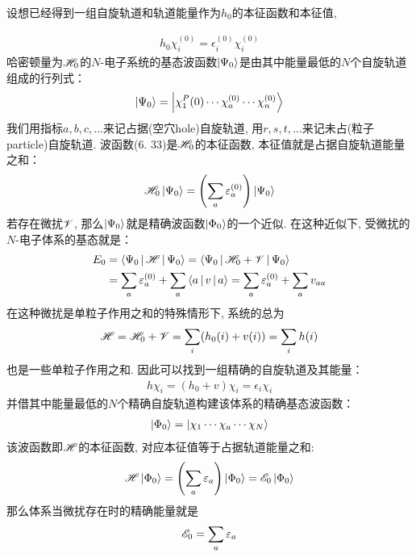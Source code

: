 设想已经得到一组自旋轨道和轨道能量作为$h_0$的本征函数和本征值,

\begin{align}
h_0\chi_i^{(0)} = \epsilon_i^{(0)} \chi_i^{(0)}
\end{align}
哈密顿量为$\mathscr{H}_0$的$N$-电子系统的基态波函数$\Ket{\Psi_0}$是由其中能量最低的$N$个自旋轨道组成的行列式：
\begin{align}
\Ket{\Psi_0} = \Ket{\chi_1^P(0)\cdots\chi_a^{(0)}\cdots\chi_n^{(0)}}
\end{align}
我们用指标$a,b,c,\ldots$来记占据(空穴hole)自旋轨道, 
用$r,s,t,\ldots$来记未占(粒子particle)自旋轨道. 
波函数(6.
33)是$\mathscr{H}_0$的本征函数, 
本征值就是占据自旋轨道能量之和：
\begin{align*}
\mathscr{H}_0\Ket{\Psi_0} = \left( \sum_a\varepsilon_a^{(0)} \right)\Ket{\Psi_0}
\end{align*}
若存在微扰$\mathscr{V}$, 
那么$\Ket{\Psi_0}$就是精确波函数$\Ket{\Phi_0}$的一个近似. 
在这种近似下, 
受微扰的$N$-电子体系的基态就是：
\begin{align}
E_0 & = \Braket{\Psi_0|\mathscr{H}|\Psi_0} = \Braket{\Psi_0|\mathscr{H}_0+\mathscr{V}|\Psi_0}\notag\\
    & = \sum_a\varepsilon_a^{(0)} + \sum_a\Braket{a|v|a} = \sum_a\varepsilon_a^{(0)} + \sum_av_{aa}
\end{align}
在这种微扰是单粒子作用之和的特殊情形下, 
系统的总\ha 为
\begin{align}
\mathscr{H} = \mathscr{H}_0 + \mathscr{V} = \sum_i(h_0(i)+v(i)) = \sum_ih(i) 
\end{align}
也是一些单粒子作用之和. 
因此可以找到一组精确的自旋轨道及其能量：
\begin{align}
h\chi_i = (h_0+v)\chi_i = \epsilon_i\chi_i
\end{align}
并借其中能量最低的$N$个精确自旋轨道构建该体系的精确基态波函数：
\begin{align}
\Ket{\Phi_0} = \Ket{\chi_1\cdots\chi_a\cdots\chi_N}
\end{align}
该波函数即$\mathscr{H}$的本征函数, 
对应本征值等于占据轨道能量之和:
\begin{align*}
\mathscr{H}\Ket{\Phi_0} = \left(\sum_a\varepsilon_a \right)\Ket{\Phi_0} = \mathscr{E}_0\Ket{\Phi_0}
\end{align*}
那么体系当微扰存在时的精确能量就是
\begin{align}
\mathscr{E}_0 = \sum_a\varepsilon_a
\end{align}

